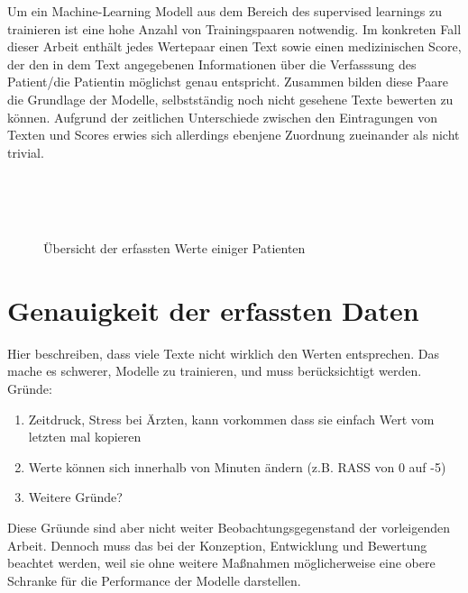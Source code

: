 Um ein Machine-Learning Modell aus dem Bereich des supervised learnings zu trainieren ist eine hohe Anzahl von Trainingspaaren notwendig. Im konkreten Fall dieser Arbeit enthält jedes Wertepaar einen Text sowie einen medizinischen Score, der den in dem Text angegebenen Informationen über die Verfasssung des Patient/die Patientin möglichst genau entspricht. Zusammen bilden diese Paare die Grundlage der Modelle, selbstständig noch nicht gesehene Texte bewerten zu können.
Aufgrund der zeitlichen Unterschiede zwischen den Eintragungen von Texten und Scores erwies sich allerdings ebenjene Zuordnung zueinander als nicht trivial.

\begin{figure}
    \centering
     \\
     \\
     \\
    \caption{Übersicht der erfassten Werte einiger Patienten}
    \label{fig:pat_example_scatterplots}
\end{figure}

\section{Genauigkeit der erfassten Daten}
Hier beschreiben, dass viele Texte nicht wirklich den Werten entsprechen. Das mache es schwerer, Modelle zu trainieren, und muss berücksichtigt werden. Gründe:
\begin{enumerate}
    \item Zeitdruck, Stress bei Ärzten, kann vorkommen dass sie einfach Wert vom letzten mal kopieren
    \item Werte können sich innerhalb von Minuten ändern (z.B. RASS von 0 auf -5)
    \item Weitere Gründe?
\end{enumerate}
Diese Grüunde sind aber nicht weiter Beobachtungsgegenstand der vorleigenden Arbeit. Dennoch muss das bei der Konzeption, Entwicklung und Bewertung beachtet werden, weil sie ohne weitere Maßnahmen möglicherweise eine obere Schranke für die Performance der Modelle darstellen.

